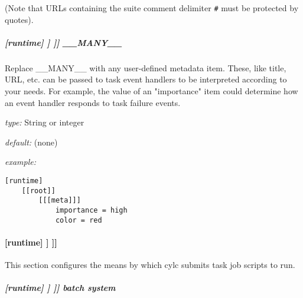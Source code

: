 (Note that URLs containing the suite comment delimiter
\lstinline=#= must be protected by quotes).

\subparagraph[\_\_MANY\_\_]{[runtime] \textrightarrow [[\_\_NAME\_\_]] \textrightarrow [[[meta]]] \textrightarrow \_\_MANY\_\_}

Replace \_\_MANY\_\_ with any user-defined metadata item. These, like title, URL, etc. can be passed
to task event handlers to be interpreted according to your needs. For example, the value of an
"importance" item could determine how an event handler responds to task failure events.

\begin{myitemize}
\item {\em type:} String or integer
\item {\em default:} (none)
\item {\em example:}
    \begin{lstlisting}
[runtime]
    [[root]]
        [[[meta]]]
            importance = high
            color = red
    \end{lstlisting}
\end{myitemize}

\paragraph[{[[[}job{]]]}]{[runtime] \textrightarrow [[\_\_NAME\_\_]] \textrightarrow [[[job]]]}

This section configures the means by which cylc submits task job scripts to run.

\subparagraph[batch system]{[runtime] \textrightarrow [[\_\_NAME\_\_]] \textrightarrow [[[job]]] \textrightarrow batch system}
\label{RuntimeJobSubMethods}

